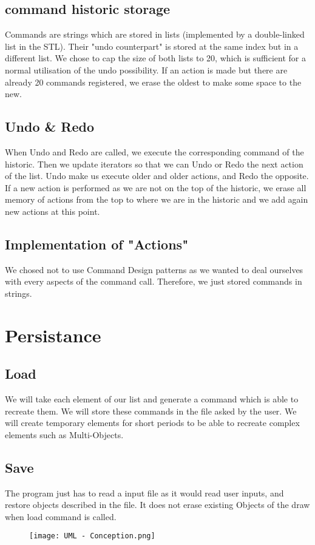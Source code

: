 \documentclass[a4paper, 12pts]{article}
\begin{document}
    \subsection{command historic storage}
        Commands are strings which are stored in lists (implemented by a double-linked list in the STL). Their "undo
        counterpart" is stored at the same index but in a different list. We chose to cap the size of both lists to 20,
        which is sufficient for a normal utilisation of the undo possibility. If an action is made but there are
        already 20 commands registered, we erase the oldest to make some space to the new.

   \subsection{Undo \& Redo}
	When Undo and Redo are called, we execute the corresponding command of the historic. Then we update iterators so that we can Undo or Redo the next action of the list. Undo make us execute older and older actions, and Redo the opposite. If a new action is performed as we are not on the top of the historic, we erase all memory of actions from the top to where we are in the historic and we add again new actions at this point.

   \subsection{Implementation of "Actions"}
	We chosed not to use Command Design patterns as we wanted to deal ourselves with every aspects of the command call. Therefore, we just stored commands in strings.	

\section{Persistance}
    \subsection{Load}
	We will take each element of our list and generate a command which is able to recreate them. We will store these commands in the file asked by the user. We will create temporary elements for short periods to be able to recreate complex elements such as Multi-Objects.
    \subsection{Save}
	The program just has to read a input file as it would read user inputs, and restore objects described in the file. It does not erase existing Objects of the draw when load command is called.
\begin{figure}[b]
	\centerline{\texttt{[image: UML - Conception.png]}}
\end{figure}
\end{document}

